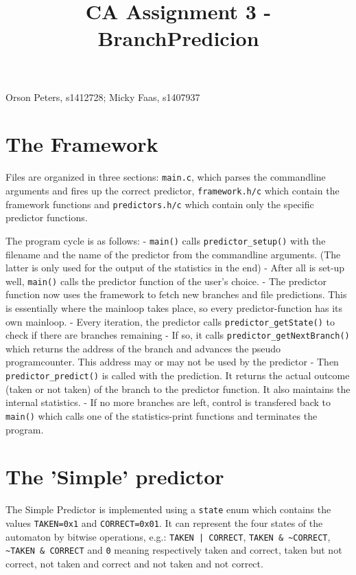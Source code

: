 \documentclass[a4paper]{article}
\title{\phantomsection%
  CA Assignment  3 - BranchPredicion%
  \label{ca-assignment-3-branchpredicion}}
\author{}
\date{}
\begin{document}
\maketitle

Orson Peters, s1412728; Micky Faas, s1407937


\section{The Framework%
  \label{the-framework}%
}

Files are organized in three sections: \texttt{main.c}, which parses the commandline
arguments and fires up the correct predictor, \texttt{framework.h/c} which contain
the framework functions and \texttt{predictors.h/c} which contain only the specific
predictor functions.

The program cycle is as follows:
- \texttt{main()} calls \texttt{predictor\_setup()} with the filename and the name of the
predictor from the commandline arguments. (The latter is only used for the
output of the statistics in the end)
- After all is set-up well, \texttt{main()} calls the predictor function of the
user's choice.
- The predictor function now uses the framework to fetch new branches and file
predictions. This is essentially where the mainloop takes place, so every
predictor-function has its own mainloop.
- Every iteration, the predictor calls \texttt{predictor\_getState()} to check if
there are branches remaining
- If so, it calls \texttt{predictor\_getNextBranch()} which returns the address of the
branch and advances the pseudo programcounter. This address may or may not be
used by the predictor
- Then \texttt{predictor\_predict()} is called with the prediction. It returns the
actual outcome (taken or not taken) of the branch to the predictor function.
It also maintains the internal statistics.
- If no more branches are left, control is transfered back to \texttt{main()} which
calls one of the statistics-print functions and terminates the program.


\section{The 'Simple' predictor%
  \label{the-simple-predictor}%
}

The Simple Predictor is implemented using a \texttt{state} enum which contains the
values \texttt{TAKEN=0x1} and \texttt{CORRECT=0x01}. It can represent the four states of the
automaton by bitwise operations, e.g.: \texttt{TAKEN | CORRECT}, \texttt{TAKEN \& \textasciitilde{}CORRECT},
\texttt{\textasciitilde{}TAKEN \& CORRECT} and \texttt{0} meaning respectively taken and correct, taken but
not correct, not taken and correct and not taken and not correct.
\end{document}
